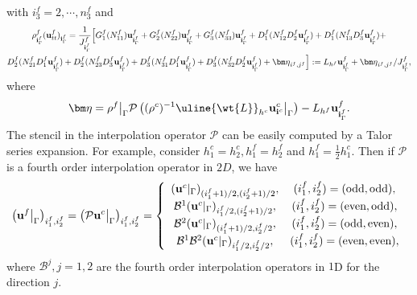 with $ i_3^f = 2,\cdots,n_3^f$ and
\begin{multline}\label{fine_scheme_1}
\rho_{{\bf i}^f_{\Gamma}}^f ({\bf u}_{tt}^f)_{{\bf i}^f_{\Gamma}} = \frac{1}{J_{{\bf i}^f_{\Gamma}}^f}\Big[G_1^f(N_{11}^f){\bf u}_{{\bf i}_\Gamma^f}^f+G_2^f(N_{22}^f){\bf u}_{{\bf i}_\Gamma^f}^f
+G_3^f(N_{33}^f){\bf u}_{{\bf i}^f_{\Gamma}}^f
+D_1^f(N_{12}^fD_2^f{\bf u}_{{\bf i}^f_{\Gamma}}^f)+D_1^f(N_{13}^fD_3^f{\bf u}_{{\bf i}^f_{\Gamma}}^f)
+\\D_2^f(N_{21}^fD_1^f{\bf u}_{{\bf i}^f_{\Gamma}}^f)+
D_2^f(N_{23}^fD_3^f{\bf u}_{{\bf i}^f_{\Gamma}}^f)
+D_3^f(N_{31}^fD_1^f{\bf u}_{{\bf i}^f_{\Gamma}}^f)
+D_3^f(N_{32}^fD_2^f{\bf u}_{{\bf i}^f_{\Gamma}}^f)+{\bm \eta}_{i^f,j^f}\Big]
:= L_{h^f}{\bf u}^f_{{\bf i}^f_{\Gamma}}+{\bm \eta}_{i^f,j^f}/J^f_{{\bf i}^f_{\Gamma}},
\end{multline}
where
\begin{equation}
{\bm \eta} = \rho^f\big|_{\Gamma}\mathcal{P}\left((\rho^c)^{-1}\uline{\wt{L}}_{h^c} {\bf{u}}^c_{{\bf i}^c}\big|_{\Gamma}\right) - L_{h^f}{\bf u}^f_{{\bf i}^f_{\Gamma}}.
\end{equation}
The stencil in the interpolation operator $\mathcal{P}$ can be easily computed by a Talor series expansion. For example, consider $h_1^c = h_2^c, h_1^f = h_2^f$ and $h_1^f = \frac{1}{2}h_1^c$. Then if  $\mathcal{P}$ is a fourth order interpolation operator in $2D$, we have
\begin{align}\label{interpolation}
\left({\bf u}^f\big|_{\Gamma}\right)_{i_1^f,i_2^f} = \left(\mathcal{P} {\bf u}^c\big|_{\Gamma}\right)_{i_1^f,i_2^f} = \left\{\begin{array}{cc}
({\bf u}^c|_{\Gamma})_{(i_1^f+1)/2,(i_2^f+1)/2}, &(i_1^f,i_2^f) = (\text{odd},\text{odd}),\\
\mathcal{B}^1 ({\bf u}^c|_{\Gamma})_{i_1^f/2,(i_2^f+1)/2}, &(i_1^f,i_2^f) = (\text{even},\text{odd}),\\
\mathcal{B}^2 ({\bf u}^c|_{\Gamma})_{(i_1^f+1)/2,i_2^f/2},& (i_1^f,i_2^f) = (\text{odd},\text{even}),\\
\mathcal{B}^1\mathcal{B}^2 ({\bf u}^c|_{\Gamma})_{i_1^f/2,i_2^f/2}, & (i_1^f,i_2^f) = (\text{even},\text{even}),
\end{array}\right.
\end{align}
where $\mathcal{B}^j, j = 1,2$ are the fourth order interpolation operators in $1$D for the direction $j$.  
